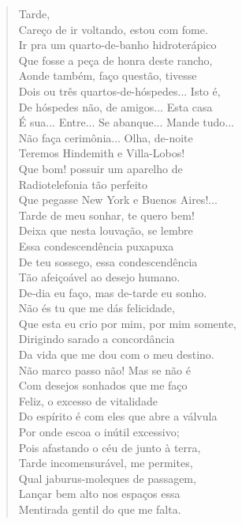 \begin{verse}
\hfill{}Tarde,\\
Careço de ir voltando, estou com fome.\\
Ir pra um quarto-de-banho hidroterápico\\
Que fosse a peça de honra deste rancho,\\
Aonde também, faço questão, tivesse\\
Dois ou três quartos-de-hóspedes... Isto é,\\
De hóspedes não, de amigos... Esta casa\\
É sua... Entre... Se abanque... Mande tudo...\\
Não faça cerimônia... Olha, de-noite\\
Teremos Hindemith e Villa-Lobos!\\
Que bom! possuir um aparelho de\\
Radiotelefonia tão perfeito\\
Que pegasse New York e Buenos Aires!...\\
Tarde de meu sonhar, te quero bem!\\
Deixa que nesta louvação, se lembre\\
Essa condescendência puxapuxa\\
De teu sossego, essa condescendência\\
Tão afeiçoável ao desejo humano.\\
De-dia eu faço, mas de-tarde eu sonho.\\
Não és tu que me dás felicidade,\\
Que esta eu crio por mim, por mim somente,\\
Dirigindo sarado a concordância\\
Da vida que me dou com o meu destino.\\
Não marco passo não! Mas se não é\\
Com desejos sonhados que me faço\\
Feliz, o excesso de vitalidade\\
Do espírito é com eles que abre a válvula\\
Por onde escoa o inútil excessivo;\\
Pois afastando o céu de junto à terra,\\
Tarde incomensurável, me permites,\\
Qual jaburus-moleques de passagem,\\
Lançar bem alto nos espaços essa\\
Mentirada gentil do que me falta.


\end{verse}
